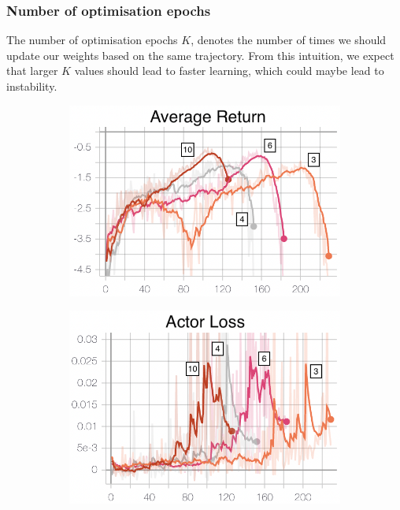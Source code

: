 \subsubsection{Number of optimisation epochs}
The number of optimisation epochs $K$, denotes the number of times we should update our weights based on the same trajectory. From this intuition, we expect that larger $K$ values should lead to faster learning, which could maybe lead to instability. 
\begin{figure}[hbt]
     \centering
     \begin{subfigure}[b]{0.32\textwidth}
         \centering
         \includegraphics[width=\textwidth]{figures/5_/Training/ppo_noptepochsAvgReturn.png}
         \caption{}
         \label{fig:5_training_ppo_noptepochsAvgReturn}
     \end{subfigure} 
     \hfill
     \begin{subfigure}[b]{0.32\textwidth}
         \centering
         \includegraphics[width=\textwidth]{figures/5_/Training/ppo_noptepochsActorL.png}

\end{subfigure}
\end{figure}
